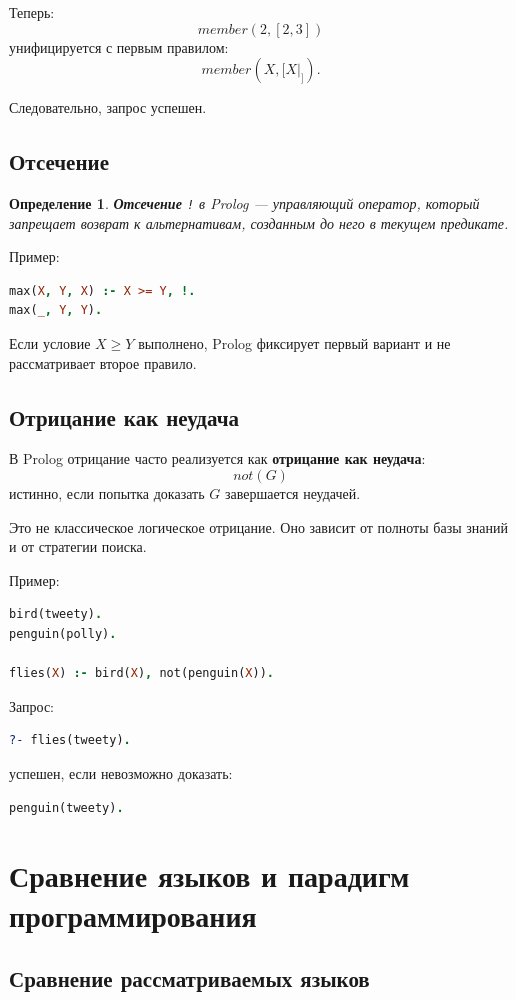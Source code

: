 \documentclass[12pt,a4paper]{article}
\newtheorem{definition}{Определение}
\begin{document}
Теперь:
\[
member(2,[2,3])
\]
унифицируется с первым правилом:
\[
member(X,[X|_]).
\]

Следовательно, запрос успешен.

\subsection{Отсечение}

\begin{definition}
\textbf{Отсечение} \texttt{!} в Prolog --- управляющий оператор, который запрещает возврат к альтернативам, созданным до него в текущем предикате.
\end{definition}

Пример:
\begin{lstlisting}[language=Prolog]
max(X, Y, X) :- X >= Y, !.
max(_, Y, Y).
\end{lstlisting}

Если условие $X \geq Y$ выполнено, Prolog фиксирует первый вариант и не рассматривает второе правило.

\subsection{Отрицание как неудача}

В Prolog отрицание часто реализуется как \textbf{отрицание как неудача}:
\[
not(G)
\]
истинно, если попытка доказать $G$ завершается неудачей.

Это не классическое логическое отрицание. Оно зависит от полноты базы знаний и от стратегии поиска.

Пример:
\begin{lstlisting}[language=Prolog]
bird(tweety).
penguin(polly).

flies(X) :- bird(X), not(penguin(X)).
\end{lstlisting}

Запрос:
\begin{lstlisting}[language=Prolog]
?- flies(tweety).
\end{lstlisting}
успешен, если невозможно доказать:
\begin{lstlisting}[language=Prolog]
penguin(tweety).
\end{lstlisting}

\section{Сравнение языков и парадигм программирования}

\subsection{Сравнение рассматриваемых языков}
\end{document}
